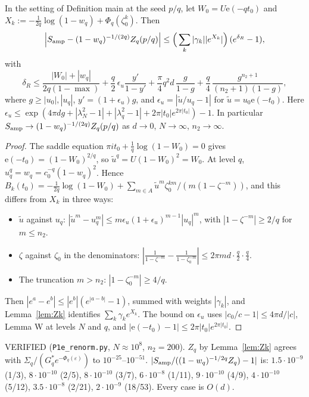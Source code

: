 \documentclass[11pt]{article}
\theoremstyle{definition}\newtheorem{definition}[theorem]{Definition}
\theoremstyle{remark}\newtheorem{remark}[theorem]{Remark}
\newcommand{\e}{\mathrm{e}}
\begin{document}
\begin{lemma}\label{lem:R}
In the setting of Definition main at the seed $p/q$, let $W_0=U\e(-qt_0)$ and $X_k:=-\frac1{2q}\log(1-w_q)+\Phi_q(\zeta_0^k)$. Then
\[\Big|S_{\rm amp}-(1-w_q)^{-1/(2q)}Z_q(p/q)\Big|\le\Big(\sum_k|\gamma_k||e^{X_k}|\Big)\,(e^{\delta_R}-1),\]
with
\[\delta_R\le\frac{|W_0|+|w_q|}{2q(1-\max)}+\frac q2\,\epsilon_u\frac{y'}{1-y'}+\frac\pi4q^2d\,\frac{g}{1-g}+\frac q4\,\frac{g^{n_2+1}}{(n_2+1)(1-g)},\]
where $g\ge|u_0|,|u_q|$, $y'=(1+\epsilon_u)g$, and $\epsilon_u=|\tilde u/u_q-1|$ for $\tilde u=u_0\e(-t_0)$.
Here $\epsilon_u\le\exp(4\pi dg+|\lambda_N^2-1|+|\lambda_q^2-1|+2\pi|t_0|e^{2\pi|t_0|})-1$.
In particular $S_{\rm amp}\to(1-w_q)^{-1/(2q)}Z_q(p/q)$ as $d\to0$, $N\to\infty$, $n_2\to\infty$.
\end{lemma}
\begin{proof}
The saddle equation $\pi it_0+\frac1q\log(1-W_0)=0$ gives $\e(-t_0)=(1-W_0)^{2/q}$, so $\tilde u^q=U(1-W_0)^2=W_0$. At level $q$, $u_q^q=w_q=c_0^{-q}(1-w_q)^2$.
Hence $B_k(t_0)=-\frac1{2q}\log(1-W_0)+\sum_{m\in A}\tilde u^m\zeta_0^{km}/(m(1-\zeta^{-m}))$, and this differs from $X_k$ in three ways:
\begin{itemize}
\item $\tilde u$ against $u_q$: $|\tilde u^m-u_q^m|\le m\epsilon_u(1+\epsilon_u)^{m-1}|u_q|^m$, with $|1-\zeta^{-m}|\ge2/q$ for $m\le n_2$.
\item $\zeta$ against $\zeta_0$ in the denominators: $|\frac1{1-\zeta^{-m}}-\frac1{1-\zeta_0^{-m}}|\le 2\pi md\cdot\frac q2\cdot\frac q4$.
\item The truncation $m>n_2$: $|1-\zeta_0^{-m}|\ge4/q$.
\end{itemize}
Then $|e^{a}-e^{b}|\le|e^b|(e^{|a-b|}-1)$, summed with weights $|\gamma_k|$, and Lemma~\ref{lem:Zk} identifies $\sum_k\gamma_ke^{X_k}$.
The bound on $\epsilon_u$ uses $|c_0/c-1|\le4\pi d/|c|$, Lemma W at levels $N$ and $q$, and $|\e(-t_0)-1|\le2\pi|t_0|e^{2\pi|t_0|}$.
\end{proof}
VERIFIED (\texttt{P1e\_renorm.py}, $N\approx10^8$, $n_2=200$). $Z_q$ by Lemma~\ref{lem:Zk} agrees with $\Sigma_q/(G^*_qe^{-\Phi_q(\varepsilon)})$ to $10^{-25}$--$10^{-51}$. $|S_{\rm amp}/((1-w_q)^{-1/2q}Z_q)-1|$ is:
$1.5\cdot10^{-9}$ (1/3), $8\cdot10^{-10}$ (2/5), $8\cdot10^{-10}$ (3/7), $6\cdot10^{-8}$ (1/11), $9\cdot10^{-10}$ (4/9), $4\cdot10^{-10}$ (5/12), $3.5\cdot10^{-8}$ (2/21), $2\cdot10^{-9}$ (18/53).
Every case is $O(d)$.
\end{document}
